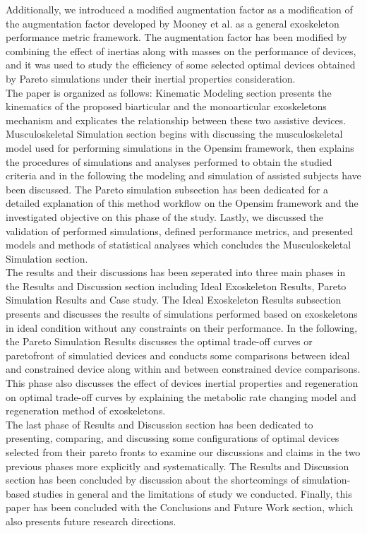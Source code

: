 \documentclass[10pt,letterpaper]{article}
\begin{document}
Additionally, we introduced a modified augmentation factor as a modification of the augmentation factor developed by Mooney et al. \cite{41} as a general exoskeleton performance metric framework. The augmentation factor has been modified by combining the effect of inertias along with masses on the performance of devices, and it was used to study the efficiency of some selected optimal devices obtained by Pareto simulations under their inertial properties consideration.\\
The paper is organized as follows: Kinematic Modeling section presents the kinematics of the proposed biarticular and the monoarticular exoskeletons mechanism and explicates the relationship between these two assistive devices. Musculoskeletal Simulation section begins with discussing the musculoskeletal model used for performing simulations in the Opensim framework, then explains the procedures of simulations and analyses performed to obtain the studied criteria and in the following the modeling and simulation of assisted subjects have been discussed. The Pareto simulation subsection has been dedicated for a detailed explanation of this method workflow on the Opensim framework and the investigated objective on this phase of the study. Lastly, we discussed the validation of performed simulations, defined performance metrics, and presented models and methods of statistical analyses which concludes the Musculoskeletal Simulation section.\\
The results and their discussions has been seperated into three main phases in the Results and Discussion section including Ideal Exoskeleton Results, Pareto Simulation Results and Case study. The Ideal Exoskeleton Results subsection presents and discusses the results of simulations performed based on exoskeletons in ideal condition without any constraints on their performance. In the following, the Pareto Simulation Results discusses the optimal trade-off curves or paretofront of simulatied devices and conducts some comparisons between ideal and constrained device along within and between constrained device comparisons. This phase also discusses the effect of devices inertial properties and regeneration on optimal trade-off curves by explaining the metabolic rate changing model and regeneration method of exoskeletons.\\
The last phase of Results and Discussion section has been dedicated to presenting, comparing, and discussing some configurations of optimal devices selected from their pareto fronts to examine our discussions and claims in the two previous phases more explicitly and systematically. The  Results and Discussion section has been concluded by discussion about the shortcomings of simulation-based studies in general and the limitations of study we conducted. Finally, this paper has been concluded with the Conclusions and Future Work section, which also presents future research directions.
\end{document}
